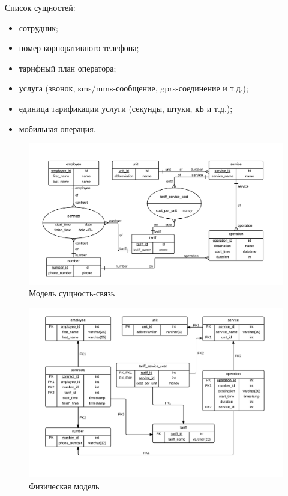 \documentclass[10pt, a4paper]{article}
\begin{document}
Список сущностей:
\begin{itemize}
	\item сотрудник;
	\item номер корпоративного телефона;
	\item тарифный план оператора;
	\item услуга (звонок, sms/mms-сообщение, gprs-соединение и т.д.);
	\item единица тарификации услуги (секунды, штуки, кБ и т.д.);
	\item мобильная операция.
\end{itemize}

\begin{figure}[H]
	\centering
	\includegraphics[scale=0.2]{erm}
	\caption{Модель сущность-связь}
	\label{fig:erm}
\end{figure}

\begin{figure}[H]
	\centering
	\includegraphics[scale=0.2]{pdm}
	\caption{Физическая модель}
	\label{fig:pdm}
\end{figure}
\end{document}
